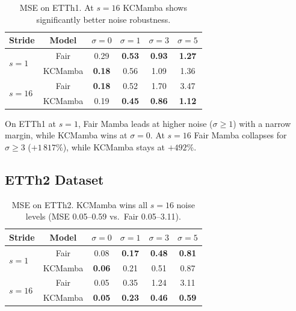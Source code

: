 \begin{table}[H]
    \centering
    \small
    \begin{tabular}{|l|c|cccc|}
        \hline
        \textbf{Stride} & \textbf{Model} &
        $\sigma=0$ & $\sigma=1$ & $\sigma=3$ & $\sigma=5$ \\
        \hline\hline
        \multirow{2}{*}{$s=1$}
            & Fair  & 0.29 & \textbf{0.53} & \textbf{0.93} & \textbf{1.27} \\
            & KCMamba   & \textbf{0.18} & 0.56 & 1.09 & 1.36 \\
        \hline
        \multirow{2}{*}{$s=16$}
            & Fair  & \textbf{0.18} & 0.52 & 1.70 & 3.47 \\
            & KCMamba   & 0.19 & \textbf{0.45} & \textbf{0.86} & \textbf{1.12} \\
        \hline
    \end{tabular}
    \caption{MSE on ETTh1. At $s=16$ KCMamba shows significantly better noise robustness.}
    \label{tab:etth1}
\end{table}

On ETTh1 at $s=1$, Fair Mamba leads at higher noise ($\sigma \ge 1$) with a narrow
margin, while KCMamba wins at $\sigma=0$. At $s=16$ Fair
Mamba collapses for $\sigma \ge 3$ ($+1\,817\%$), while KCMamba stays at $+492\%$.

\subsection{ETTh2 Dataset}

\begin{table}[H]
    \centering
    \small
    \begin{tabular}{|l|c|cccc|}
        \hline
        \textbf{Stride} & \textbf{Model} &
        $\sigma=0$ & $\sigma=1$ & $\sigma=3$ & $\sigma=5$ \\
        \hline\hline
        \multirow{2}{*}{$s=1$}
            & Fair  & 0.08 & \textbf{0.17} & \textbf{0.48} & \textbf{0.81} \\
            & KCMamba   & \textbf{0.06} & 0.21 & 0.51 & 0.87 \\
        \hline
        \multirow{2}{*}{$s=16$}
            & Fair  & 0.05 & 0.35 & 1.24 & 3.11 \\
            & KCMamba   & \textbf{0.05} & \textbf{0.23} & \textbf{0.46} & \textbf{0.59} \\
        \hline
    \end{tabular}
    \caption{MSE on ETTh2. KCMamba wins all $s=16$ noise levels (MSE 0.05--0.59 vs.\ Fair 0.05--3.11).}
    \label{tab:etth2}
\end{table}

